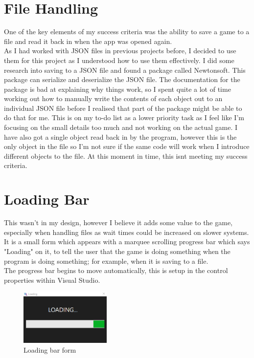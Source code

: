 \section{File Handling}
One of the key elements of my success criteria was the ability to save a game to a file and read it back in when the app was opened again. \\
As I had worked with JSON files in previous projects before, I decided to use them for this project as I understood how to use them effectively. I did some research into saving to a JSON file and found a package called Newtonsoft. This package can serialize and deserialize the JSON file. The documentation for the package is bad at explaining why things work, so I spent quite a lot of time working out how to manually write the contents of each object out to an individual JSON file before I realised that part of the package might be able to do that for me. \newline
This is on my to-do list as a lower priority task as I feel like I'm focusing on the small details too much and not working on the actual game. I have also got a single object read back in by the program, however this is the only object in the file so I'm not sure if the same code will work when I introduce different objects to the file. At this moment in time, this isn\textquotesingle t meeting my success criteria.

\section{Loading Bar}
This wasn't in my design, however I believe it adds some value to the game, especially when handling files as wait times could be increased on slower systems.\\
It is a small form which appears with a marquee scrolling progress bar which says "Loading" on it, to tell the user that the game is doing something when the program is doing something; for example, when it is saving to a file.\\
The progress bar begins to move automatically, this is setup in the control properties within Visual Studio.
\begin{figure}[H]
    \centering
    \includegraphics[width=0.4\textwidth]{images/implementation/loadingBarForm.png}
    \caption{Loading bar form}
    \label{fig:implementation-loadingBarForm}
\end{figure}


